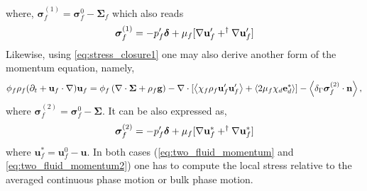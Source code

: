 where, $\bm\sigma_f^{(1)}=\bm\sigma_f^0 - \bm\Sigma_f$ which also reads %
\begin{equation}
\bm\sigma_f^{(1)} = -p_f'\bm\delta
+ \mu_f [
    \mathbf{\nabla} \textbf{u}_f'
    + ^\dagger \mathbf{\nabla} \textbf{u}_f']
\end{equation} 
Likewise, using \ref{eq:stress_closure1} one may also derive another form of the momentum equation, namely,
\begin{equation}
    \phi_f \rho_f(\pddt + \textbf{u}_f  \cdot \grad) \textbf{u}_f
    = \phi_f 
    \left(\div \bm{\Sigma}
    + \rho_f \textbf{g}\right)
    - \div 
    [\avg{\chi_f\rho_f \textbf{u}_f'\textbf{u}_f'} + \avg{2\mu_f \chi_d \textbf{e}_d^*}]
    - \avg{\delta_\Gamma \bm\sigma_f^{(2)}\cdot \textbf{n}},
    \label{eq:two_fluid_momentum2}
\end{equation} 
where $\bm\sigma_f^{(2)}=\bm\sigma_f^0 - \bm\Sigma$. 
It can be also expressed as, 
\begin{equation}
    \bm\sigma_f^{(2)} 
    =
    -p_f'\bm\delta
    + \mu_f [
        \grad \textbf{u}_f^*
        + ^\dagger \grad \textbf{u}_f^*
    ]
    \label{eq:disturbance_stress}
\end{equation}
where $\textbf{u}_f^*= \textbf{u}_f^0 - \textbf{u}$.
In both cases (\ref{eq:two_fluid_momentum} and \ref{eq:two_fluid_momentum2}) one has to compute the local stress relative to the averaged continuous phase motion or bulk phase motion. 
